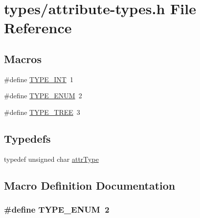 \hypertarget{attribute-types_8h}{}\section{types/attribute-\/types.h File Reference}
\label{attribute-types_8h}
\subsection*{Macros}
\begin{DoxyCompactItemize}
\item 
\#define \hyperlink{attribute-types_8h_a56e5f9a95536838408fcca8f22d541b4}{T\+Y\+P\+E\+\_\+\+I\+NT}~1
\item 
\#define \hyperlink{attribute-types_8h_aee675b6c98404bb71350fab3dd49a9b8}{T\+Y\+P\+E\+\_\+\+E\+N\+UM}~2
\item 
\#define \hyperlink{attribute-types_8h_a5550b800a4fcb6008fc9cf188fd073f0}{T\+Y\+P\+E\+\_\+\+T\+R\+EE}~3
\end{DoxyCompactItemize}
\subsection*{Typedefs}
\begin{DoxyCompactItemize}
\item 
typedef unsigned char \hyperlink{attribute-types_8h_a8ed2f1d0c280dd48cac531e6b26ef8fc}{attr\+Type}
\end{DoxyCompactItemize}


\subsection{Macro Definition Documentation}
\subsubsection[{\texorpdfstring{T\+Y\+P\+E\+\_\+\+E\+N\+UM}{TYPE_ENUM}}]{\setlength{\rightskip}{0pt plus 5cm}\#define T\+Y\+P\+E\+\_\+\+E\+N\+UM~2}\hypertarget{attribute-types_8h_aee675b6c98404bb71350fab3dd49a9b8}{}\label{attribute-types_8h_aee675b6c98404bb71350fab3dd49a9b8}
